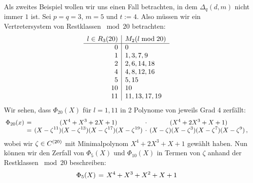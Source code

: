 
\begin{beispiel}
  Als zweites Beispiel wollen wir uns einen Fall betrachten, 
  in dem $\Delta_q(d,m)$ nicht immer $1$ ist.
  Sei $p=q=3$, $m=5$ und $t:= 4$.
  Also müssen wir ein Vertretersystem von Restklassen ${}\bmod 20$ betrachten:
  \[\begin{array}[t]{r|l}
    l \in R_3(20) & M_2(l \bmod 20) \\\hline
    0 & 0 \\
    1 & 1, 3, 7, 9 \\
    2 & 2, 6, 14, 18 \\
    4 & 4, 8, 12, 16 \\
    5 & 5, 15 \\
    10& 10 \\
    11& 11, 13, 17, 19 
    \end{array}\]
  Wir sehen, dass $\Phi_{20}(X)$ für $l=1,11$ in 
  2 Polynome von jeweils Grad $4$ zerfällt:
  \[\setlength{\arraycolsep}{2pt}\everymath{\displaystyle}
    \begin{array}{rcccc} 
      \Phi_{20}(x) &=& 
        (X^{4} + X^{3} + 2 X + 1) &\cdot& (X^{4} + 2 X^{3} + X + 1) \\
      &=& (X-\zeta^{11})(X-\zeta^{13})(X-\zeta^{17})(X-\zeta^{19}) &\cdot&
        (X-\zeta)(X-\zeta^{3})(X-\zeta^{7})(X-\zeta^{9})\,,
    \end{array}\]
  wobei wir $\zeta \in C^{(20)}$ mit Minimalpolynom $X^4+2X^3+X+1$ gewählt
  haben.
  Nun können wir den Zerfall von $\Phi_5(X)$ und $\Phi_{10}(X)$ in Termen von
  $\zeta$ anhand der Restklassen ${}\bmod{20}$ beschreiben:
  \[\setlength{\arraycolsep}{2pt}\everymath{\displaystyle}
    \begin{array}{rcccc} 
      \Phi_5(X)&=& X^4 + X^3 + X^2 + X + 1\\

\end{array}\]
\end{beispiel}
